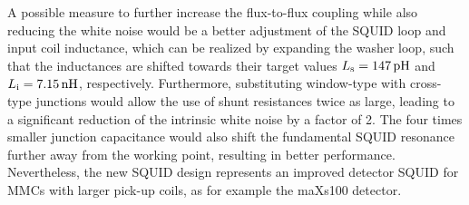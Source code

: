 A possible measure to further increase the flux-to-flux coupling while also reducing the white noise would be a better adjustment of the SQUID loop and input coil inductance, which can be realized by expanding the washer loop, such that the inductances are shifted towards their target values $L_{\rm s}=\qty{147}{\pH}$ and $L_{\rm i}=\qty{7.15}{\nH}$, respectively. Furthermore, substituting window-type with cross-type junctions would allow the use of shunt resistances twice as large, leading to a significant reduction of the intrinsic white noise by a factor of 2. The four times smaller junction capacitance would also shift the fundamental SQUID resonance further away from the working point, resulting in better performance. Nevertheless, the new SQUID design represents an improved detector SQUID for MMCs with larger pick-up coils, as for example the maXs100 detector. 
